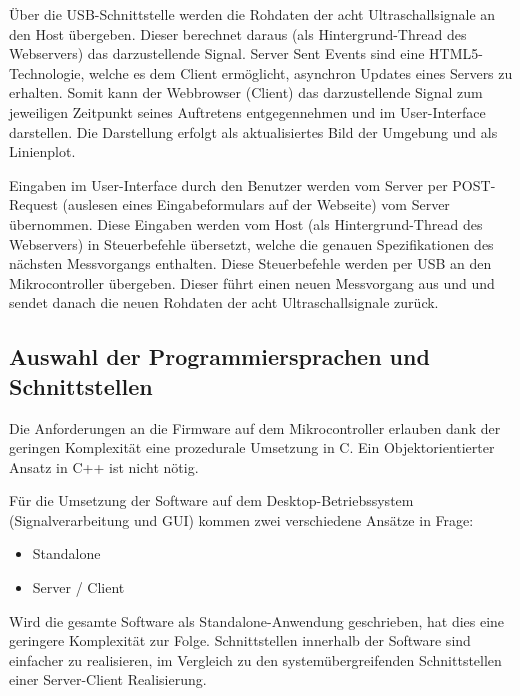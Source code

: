 Über die USB-Schnittstelle werden die Rohdaten der acht Ultraschallsignale an den Host übergeben. Dieser berechnet daraus (als Hintergrund-Thread des Webservers) das darzustellende Signal.
Server Sent Events sind eine HTML5-Technologie, welche es dem Client ermöglicht, asynchron Updates eines Servers zu erhalten. Somit kann der Webbrowser (Client) das darzustellende Signal zum jeweiligen Zeitpunkt seines Auftretens entgegennehmen und im User-Interface darstellen. Die Darstellung erfolgt als aktualisiertes Bild der Umgebung und als Linienplot.

Eingaben im User-Interface durch den Benutzer werden vom Server per POST-Request (auslesen eines Eingabeformulars auf der Webseite) vom Server übernommen. Diese Eingaben werden vom Host (als Hintergrund-Thread des Webservers) in  Steuerbefehle übersetzt, welche
die genauen Spezifikationen des nächsten Messvorgangs enthalten. Diese Steuerbefehle werden per USB an den Mikrocontroller übergeben. Dieser führt einen neuen Messvorgang aus und und sendet danach die neuen Rohdaten der acht Ultraschallsignale zurück.



\subsection{Auswahl der Programmiersprachen und Schnittstellen}\label{sec:auswahl_der_programmiersprachen_und_schnittstellen}
Die Anforderungen an die Firmware auf dem Mikrocontroller erlauben dank der geringen Komplexität eine prozedurale Umsetzung in C. Ein Objektorientierter Ansatz in C++ ist nicht nötig.

Für die Umsetzung der Software auf dem Desktop-Betriebssystem (Signalverarbeitung und GUI) kommen zwei verschiedene Ansätze in Frage:

\begin{itemize}
	\item Standalone
	\item Server / Client
\end{itemize}

Wird die gesamte Software als Standalone-Anwendung geschrieben, hat dies eine geringere Komplexität zur Folge. Schnittstellen innerhalb der Software sind einfacher zu realisieren, im Vergleich zu den systemübergreifenden Schnittstellen einer Server-Client Realisierung.

